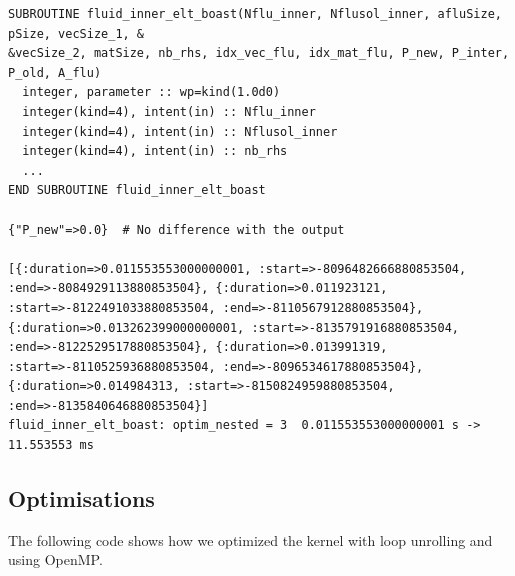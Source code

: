 \documentclass[10pt,twoside]{article}   	%
\begin{document}
\begin{lstlisting}[caption=Results (obtained with the command ruby run\_boast.rb)]
SUBROUTINE fluid_inner_elt_boast(Nflu_inner, Nflusol_inner, afluSize, pSize, vecSize_1, &
&vecSize_2, matSize, nb_rhs, idx_vec_flu, idx_mat_flu, P_new, P_inter, P_old, A_flu)
  integer, parameter :: wp=kind(1.0d0)
  integer(kind=4), intent(in) :: Nflu_inner
  integer(kind=4), intent(in) :: Nflusol_inner
  integer(kind=4), intent(in) :: nb_rhs
  ... 
END SUBROUTINE fluid_inner_elt_boast

{"P_new"=>0.0}  # No difference with the output

[{:duration=>0.011553553000000001, :start=>-8096482666880853504, :end=>-8084929113880853504}, {:duration=>0.011923121, :start=>-8122491033880853504, :end=>-8110567912880853504}, {:duration=>0.013262399000000001, :start=>-8135791916880853504, :end=>-8122529517880853504}, {:duration=>0.013991319, :start=>-8110525936880853504, :end=>-8096534617880853504}, {:duration=>0.014984313, :start=>-8150824959880853504, :end=>-8135840646880853504}]
fluid_inner_elt_boast: optim_nested = 3  0.011553553000000001 s ->  11.553553 ms
\end{lstlisting}


\subsection{Optimisations}


The following code shows how we optimized the kernel with loop unrolling and using OpenMP.
\end{document}
